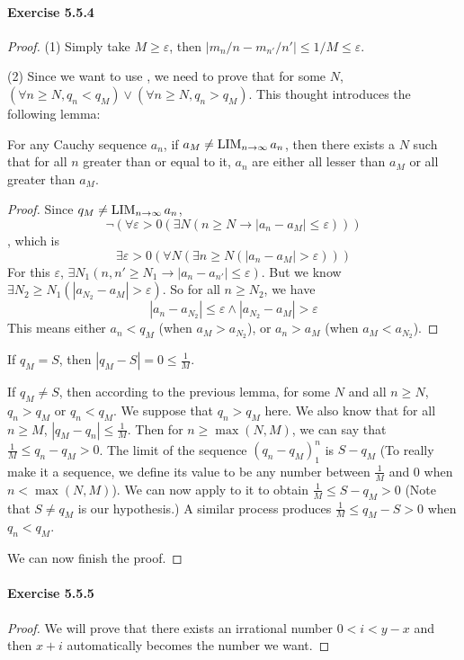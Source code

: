 \paragraph{Exercise 5.5.4} \label{exercise5.5.4}
\begin{proof}
(1) Simply take $M \geq \varepsilon$, then $|m_n/n-m_{n'}/n'|\leq 1/M\leq \varepsilon$.

(2)
Since we want to use , we need to prove that for some $N$, $(\forall n \geq N, q_n < q_M) \vee (\forall n \geq N, q_n > q_M)$. This thought introduces the following lemma:
\begin{lem}
For any Cauchy sequence $a_n$, if $a_M \neq \operatorname*{LIM}_{n \to \infty}{a_n}$, then there exists a $N$ such that for all $n$ greater than or equal to it, $a_n$ are either all lesser than $a_M$ or all greater than $a_M$.
\end{lem}
\begin{proof}
Since $q_M \neq \operatorname*{LIM}_{n \to \infty}{a_n}$,
\[
\neg (\forall \varepsilon>0(\exists N(n\geq N \to |a_n-a_M| \leq \varepsilon) ))
\]
, which is
\[
\exists \varepsilon >0 (\forall N(\exists n\geq N(|a_n-a_M| > \varepsilon)))
\]
For this $\varepsilon$, $\exists N_1(n,n'\geq N_1 \to |a_n-a_{n'}| \leq \varepsilon)$. But we know $\exists N_2 \geq N_1(|a_{N_2}-a_M| > \varepsilon)$. So for all $n \geq N_2$, we have
\[
|a_n-a_{N_2}| \leq \varepsilon \wedge |a_{N_2} - a_M| > \varepsilon
\]
This means either $a_n < q_{M}$ (when $a_M > a_{N_2}$), or $a_n > a_{M}$ (when $a_M < a_{N_2}$).
\end{proof}

If $q_M = S$, then $|q_M-S| = 0 \leq \frac{1}{M}$.

If $q_M \neq S$, then according to the previous lemma, for some $N$ and all $n\geq N$, $q_n > q_M$ or $q_n<q_M$. We suppose that $q_n > q_M$ here. We also know that for all $n\geq M$, $|q_M - q_n| \leq \frac{1}{M}$. Then for $n \geq \max(N,M)$, we can say that $\frac{1}{M} \leq q_n - q_M >0$. The limit of the sequence $(q_n-q_M)_1^n$ is $S-q_M$ (To really make it a sequence, we define its value to be any number between $\frac{1}{M}$ and 0 when $n < \max(N,M)$). We can now apply  to it to obtain $\frac{1}{M}\leq S-q_M >0$ (Note that $S \neq q_M$ is our hypothesis.) A similar process produces $\frac{1}{M}\leq q_M-S >0$ when $q_n<q_M$. 

We can now finish the proof.
\end{proof}

\paragraph{Exercise 5.5.5} \label{exercise5.5.5}
\begin{proof}
We will prove that there exists an irrational number $0<i<y-x$ and then $x+i$ automatically becomes the number we want.
\end{proof}
